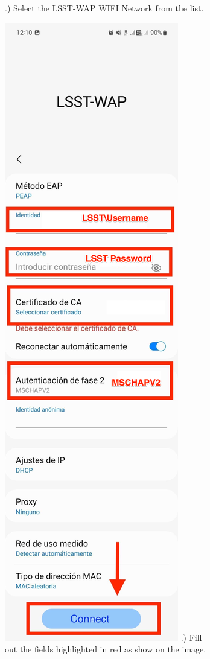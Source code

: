 \begin{figure}
\begin{subfigure}{0.4\textwidth}
      .) Select the LSST-WAP WIFI Network from the list.
    \end{subfigure}
      \hfill
    \begin{subfigure}{0.25\textwidth}
      \includegraphics[width=\textwidth]{Images/Android2.png}
      .) Fill out the fields highlighted in red as show on the image.
    \end{subfigure}
  \end{figure}
